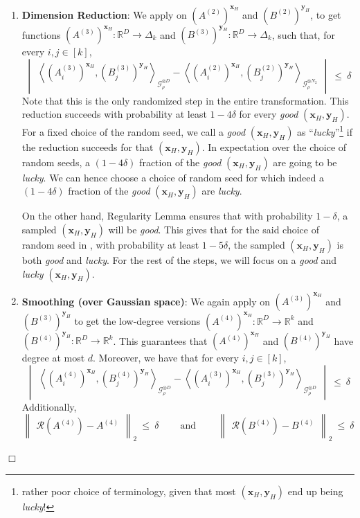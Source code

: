 \documentclass[11pt]{article}
\newcommand{\inparen}[1]{\left ( #1 \right )}
\newcommand{\inangle}[1]{\left \langle #1 \right \rangle}
\newcommand{\inabs}[1]{\begin{vmatrix} #1 \end{vmatrix}}
\newcommand{\norm}[2]{\begin{Vmatrix} #2 \end{Vmatrix}_{#1}}
\newcommand{\sAND}{\ \mathrm{and} \ }
\newcommand{\bbR}{{\mathbb R}}
\newcommand{\bx}{{\bm x}}
\newcommand{\by}{{\bm y}}
\newcommand{\calG}{\mathcal{G}}
\newcommand{\calR}{\mathcal{R}}
\newenvironment{proofof}[1]{\noindent {\em Proof of #1.} \hspace*{1mm}}{\hfill $\Box$}
\begin{document}
\begin{proofof}{\Cref{thm:non-int-sim}}
\begin{enumerate}
	\item {\bf Dimension Reduction}: We apply  on $(A^{(2)})^{\bx_H}$ and $(B^{(2)})^{\by_H}$, to get functions $(A^{(3)})^{\bx_H} : \bbR^D \to \Delta_k$ and $(B^{(3)})^{\by_H} : \bbR^D \to \Delta_k$, such that, for every $i, j \in [k]$,
	\begin{equation}
		\inabs{\inangle{(A^{(3)}_i)^{\bx_H}, (B^{(3)}_j)^{\by_H}}_{\calG_\rho^{\otimes D}} - \inangle{(A^{(2)}_i)^{\bx_H}, (B^{(2)}_j)^{\by_H}}_{\calG_\rho^{\otimes N_2}}} ~\le~ \delta \label{eqn:NIS-3}
	\end{equation}
	Note that this is the only randomized step in the entire transformation. This reduction succeeds with probability at least $1 - 4\delta$ for every {\em good} $(\bx_H, \by_H)$. For a fixed choice of the random seed, we call a {\em good} $(\bx_H, \by_H)$ as ``{\em lucky}''\footnote{rather poor choice of terminology, given that most $(\bx_H, \by_H)$ end up being {\em lucky}!} if the reduction succeeds for that $(\bx_H, \by_H)$. In expectation over the choice of random seeds, a $(1-4\delta)$ fraction of the {\em good} $(\bx_H, \by_H)$ are going to be {\em lucky}. We can hence choose a choice of random seed for which indeed a $(1-4\delta)$ fraction of the {\em good} $(\bx_H, \by_H)$ are {\em lucky}.
	
	On the other hand, Regularity Lemma ensures that with probability $1-\delta$, a sampled $(\bx_H, \by_H)$ will be {\em good}. This gives that for the said choice of random seed in , with probability at least $1-5\delta$, the sampled $(\bx_H, \by_H)$ is both {\em good} and {\em lucky}. For the rest of the steps, we will focus on a {\em good} and {\em lucky} $(\bx_H, \by_H)$.
	
	\item {\bf Smoothing (over Gaussian space)}: We again apply  on $(A^{(3)})^{\bx_H}$ and $(B^{(3)})^{\by_H}$ to get the low-degree versions $(A^{(4)})^{\bx_H} : \bbR^D \to \bbR^k$ and $(B^{(4)})^{\by_H} : \bbR^D \to \bbR^k$. This guarantees that $(A^{(4)})^{\bx_H}$ and $(B^{(4)})^{\by_H}$ have degree at most $d$. Moreover, we have that for every $i, j \in [k]$,
	\begin{equation}
	\inabs{\inangle{(A^{(4)}_i)^{\bx_H}, (B^{(4)}_j)^{\by_H}}_{\calG_\rho^{\otimes D}} - \inangle{(A^{(3)}_i)^{\bx_H}, (B^{(3)}_j)^{\by_H}}_{\calG_\rho^{\otimes D}}} ~\le~ \delta \label{eqn:NIS-4}
	\end{equation}
	Additionally,
	\[ \norm{2}{\calR(A^{(4)}) - A^{(4)}} ~\le~ \delta \qquad \sAND \qquad \norm{2}{\calR(B^{(4)}) - B^{(4)}} ~\le~ \delta \]
	

\end{enumerate}
\end{proofof}
\end{document}
